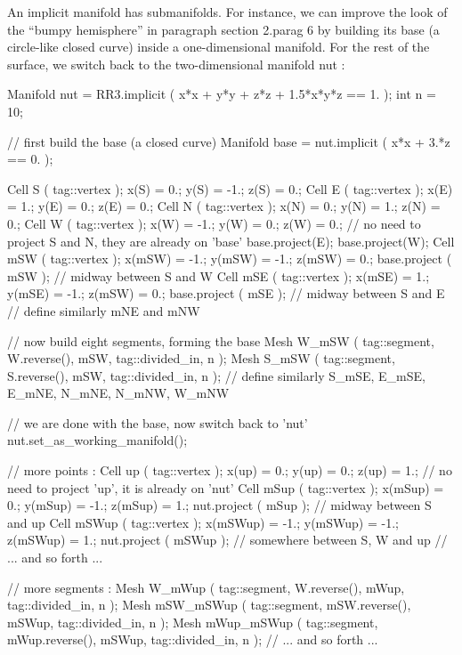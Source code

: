 An implicit manifold has submanifolds.
For instance, we can improve the look of the ``bumpy hemisphere'' in paragraph
\numb section 2.\numb parag 6 by building its base (a circle-like closed curve)
inside a one-dimensional manifold.
For the rest of the surface, we switch back to the two-dimensional manifold {\codett nut} :
\medskip

\verbatim
   Manifold nut = RR3.implicit ( x*x + y*y + z*z + 1.5*x*y*z == 1. );
   int n = 10;

   // first build the base (a closed curve) 
   Manifold base = nut.implicit ( x*x + 3.*z == 0. );

   Cell S ( tag::vertex );    x(S)  =   0.;   y(S)  =  -1.;   z(S)  =  0.;
   Cell E ( tag::vertex );    x(E)  =   1.;   y(E)  =   0.;   z(E)  =  0.;
   Cell N ( tag::vertex );    x(N)  =   0.;   y(N)  =   1.;   z(N)  =  0.;
   Cell W ( tag::vertex );    x(W)  =  -1.;   y(W)  =   0.;   z(W)  =  0.;
   // no need to project S and N, they are already on 'base'
   base.project(E);  base.project(W);
   Cell mSW ( tag::vertex );  x(mSW) = -1.;   y(mSW) = -1.;   z(mSW) = 0.;
   base.project ( mSW );  // midway between S and W
   Cell mSE ( tag::vertex );  x(mSE) =  1.;   y(mSE) = -1.;   z(mSW) = 0.;
   base.project ( mSE );  // midway between S and E
   // define similarly mNE and mNW

   // now build eight segments, forming the base
   Mesh W_mSW  ( tag::segment, W.reverse(), mSW, tag::divided_in, n );
   Mesh S_mSW  ( tag::segment, S.reverse(), mSW, tag::divided_in, n );
   // define similarly S_mSE, E_mSE, E_mNE, N_mNE, N_mNW, W_mNW

   // we are done with the base, now switch back to 'nut'
   nut.set_as_working_manifold();

   // more points :
   Cell up ( tag::vertex );   x(up) =   0.;   y(up) =   0.;   z(up) =  1.;
   // no need to project 'up', it is already on 'nut'
   Cell mSup  ( tag::vertex );  x(mSup) =  0.;   y(mSup) = -1.;   z(mSup) = 1.;
   nut.project ( mSup );  // midway between S and up
   Cell mSWup ( tag::vertex );  x(mSWup) = -1.;  y(mSWup) = -1.;  z(mSWup) = 1.;
   nut.project ( mSWup );  // somewhere between S, W and up
   // ... and so forth ...

   // more segments :
   Mesh W_mWup ( tag::segment, W.reverse(), mWup, tag::divided_in, n );
   Mesh mSW_mSWup ( tag::segment, mSW.reverse(), mSWup, tag::divided_in, n );
   Mesh mWup_mSWup ( tag::segment, mWup.reverse(), mSWup, tag::divided_in, n );
   // ... and so forth ...
\endverbatim

